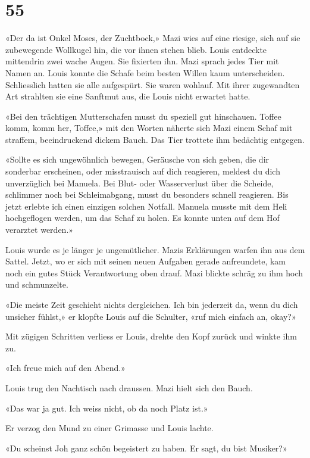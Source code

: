 \chapter{55}



«Der da ist Onkel Moses, der Zuchtbock,» Mazi wies auf eine riesige,
sich auf sie zubewegende Wollkugel hin, die vor ihnen stehen blieb. Louis entdeckte
mittendrin zwei wache Augen. Sie fixierten ihn. Mazi sprach jedes Tier
mit Namen an. Louis konnte die Schafe beim besten Willen kaum
unterscheiden.
Schliesslich hatten sie alle aufgespürt. Sie waren wohlauf.
Mit ihrer zugewandten Art strahlten sie eine Sanftmut aus, die Louis
nicht erwartet hatte.

«Bei den trächtigen Mutterschafen musst du speziell gut hinschauen.
Toffee komm, komm her, Toffee,» mit den Worten näherte sich Mazi einem
Schaf mit straffem, beeindruckend dickem Bauch. Das Tier trottete ihm
bedächtig entgegen.

«Sollte es sich ungewöhnlich bewegen, Geräusche von sich geben, die dir
sonderbar erscheinen, oder misstrauisch auf dich reagieren, meldest du
dich unverzüglich bei Manuela. Bei Blut- oder Wasserverlust über die
Scheide, schlimmer noch bei Schleimabgang, musst du besonders schnell
reagieren. Bis jetzt erlebte ich einen einzigen solchen Notfall. Manuela
musste mit dem Heli hochgeflogen werden, um das Schaf zu holen. Es
konnte unten auf dem Hof verarztet werden.»

Louis wurde es je länger je ungemütlicher. Mazis Erklärungen warfen ihn aus dem
Sattel. Jetzt, wo er sich mit seinen neuen Aufgaben gerade anfreundete,
kam noch ein gutes Stück Verantwortung oben drauf. Mazi blickte schräg
zu ihm hoch und schmunzelte.

«Die meiste Zeit geschieht nichts dergleichen. Ich bin jederzeit da,
wenn du dich unsicher fühlst,» er klopfte Louis auf die Schulter, «ruf
mich einfach an, okay?»

Mit zügigen Schritten verliess er Louis, drehte den Kopf zurück und
winkte ihm zu.

«Ich freue mich auf den Abend.»

\sectionbreak

Louis trug den Nachtisch nach draussen. Mazi hielt sich den Bauch.

«Das war ja gut. Ich weiss nicht, ob da noch Platz ist.»

Er verzog den Mund zu einer Grimasse und Louis lachte.

«Du scheinst Joh ganz schön begeistert zu haben. Er sagt, du bist
Musiker?»

